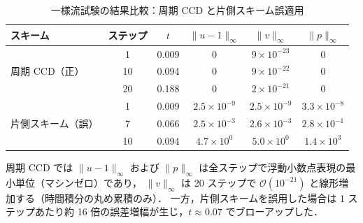 \begin{table}[htbp]
\centering
\caption{一様流試験の結果比較：周期 CCD と片側スキーム誤適用}
\label{tab:uniform_flow_comparison}
\begin{tabular}{lccccc}
\toprule
スキーム & ステップ & $t$ & $\|u-1\|_\infty$ & $\|v\|_\infty$ & $\|p\|_\infty$ \\
\midrule
\multirow{3}{*}{周期 CCD（正）}
  &  1 & 0.009 & $0$              & $9\times10^{-23}$ & $0$ \\
  & 10 & 0.094 & $0$              & $9\times10^{-22}$ & $0$ \\
  & 20 & 0.188 & $0$              & $2\times10^{-21}$ & $0$ \\
\midrule
\multirow{3}{*}{片側スキーム（誤）}
  &  1 & 0.009 & $2.5\times10^{-9}$  & $2.5\times10^{-9}$  & $3.3\times10^{-8}$ \\
  &  7 & 0.066 & $2.5\times10^{-3}$  & $2.6\times10^{-3}$  & $2.8\times10^{-1}$ \\
  & 10 & 0.094 & $4.7\times10^{0}$   & $5.0\times10^{0}$   & $1.4\times10^{3}$  \\
\bottomrule
\end{tabular}
\end{table}

\noindent
周期 CCD では $\|u-1\|_\infty$ および $\|p\|_\infty$ は全ステップで浮動小数点表現の最小単位（マシンゼロ）であり，
$\|v\|_\infty$ は 20 ステップで $\mathcal{O}(10^{-21})$ と線形増加する（時間積分の丸め累積のみ）．
一方，片側スキームを誤用した場合は 1 ステップあたり約 16 倍の誤差増幅が生じ，$t\approx0.07$ でブローアップした．
